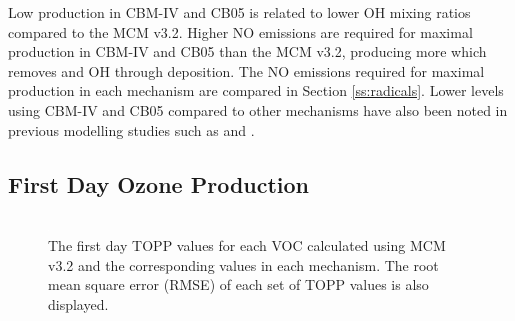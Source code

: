 Low  production in CBM-IV and CB05 is related to lower OH mixing ratios compared to the MCM v3.2. 
Higher NO emissions are required for maximal  production in CBM-IV and CB05 than the MCM v3.2, producing more   which removes  and OH through  deposition.
The NO emissions required for maximal  production in each mechanism are compared in Section \ref{ss:radicals}.
Lower  levels using CBM-IV and CB05 compared to other mechanisms have also been noted in previous modelling studies such as \citet{Luecken:2008, Emmerson:2009} and \citet{Saylor:2012}.

\subsection{First Day Ozone Production} \label{ss:day1} %

\begin{figure}
    \centering
    \includegraphics[width=\textwidth]{img/first_day_values}
    \vspace{1mm}
    \caption{The first day TOPP values for each VOC calculated using MCM v3.2 and the corresponding values in each mechanism. The root mean square error (RMSE) of each set of TOPP values is also displayed.}
    \vspace{-4mm}
    \label{f:first_day}
\end{figure}

